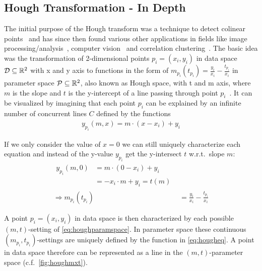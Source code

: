 
\subsection{Hough Transformation - In Depth}\label{ssec:houghindepth}
The initial purpose of the Hough transform was a technique to detect colinear points~\cite{houghOriginal1962method} and has since then found various other applications in fields like image processing/analysis~\cite{rosenfeld1969picture,ballard1981generalizing}, computer vision~\cite{davies2004machine} and correlation clustering~\cite{CASHachtert2008robust}.
The basic idea was the transformation of 2-dimensional points $p_i = (x_i,y_i)$ in data space $\mathcal{D} \subseteq \mathbb{R}^2$ with x and y axis to functions in the form of ${m_{p_i}(t_{p_i}) = \frac{y_i}{x_i} - \frac{t_{p_i}}{x_i}}$ in parameter space $\mathcal{P} \subseteq \mathbb{R}^2$, also known as Hough space, with t and m axis, where $m$ is the slope and $t$ is the y-intercept of a line passing through point $p_i$~\cite{illingworth1988survey}. It can be visualized by imagining that each point $p_i$ can be explained by an infinite number of concurrent lines $C$ defined by the functions 
\begin{align}
    {y_{p_i}(m,x) = m \cdot (x - x_i) + y_i}
\end{align}

If we only consider the value of $x=0$ we can still uniquely characterize each equation and instead of the y-value $y_{p_i}$ get the y-intersect $t$ w.r.t.\ slope $m$:
\begin{align}\label{eq:houghparamspace}
\begin{split}
y_{p_i}(m,0) 
&= m \cdot (0 - x_i) + y_i\\
&= -x_i \cdot m + y_i = t(m)
\end{split}\\
\label{eq:hougheq}
\Rightarrow m_{p_i}(t_{p_i}) &= \frac{y_i}{x_i} - \frac{t_{p_i}}{x_i}
\end{align}

A point $p_i = (x_i, y_i)$ in data space is then characterized by each possible $(m,t)$-setting of \autoref{eq:houghparamspace}. In parameter space these continuous $(m_{p_i},t_{p_i})$-settings are uniquely defined by the function in \autoref{eq:hougheq}. A point in data space therefore can be represented as a line in the $(m,t)$-parameter space (c.f.\ \autoref{fig:houghmxt}).  %

